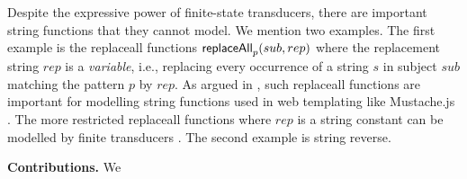 Despite the expressive power of finite-state transducers, there are important
string functions that they cannot model. We mention two examples. The first 
example is 
the 
replaceall functions $\mathsf{replaceAll}_p(sub,rep)$ where the replacement string 
$rep$ is a \emph{variable}, i.e., replacing every occurrence of a string $s$ in
subject $sub$ matching the pattern $p$ by $rep$. As argued in \cite{CCHLW18},
such replaceall
functions are important for modelling string functions used in web 
templating like Mustache.js \cite{Mustache}. The more restricted replaceall
functions where $rep$ is a string constant can be modelled by finite 
transducers \cite{LB16}.
The second example is string reverse.



%
%


\smallskip
\noindent
\textbf{Contributions.} We


